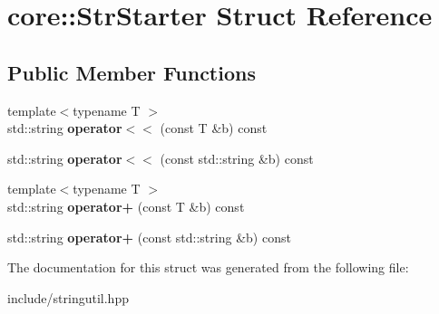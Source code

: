 \hypertarget{structcore_1_1_str_starter}{\section{core\-:\-:Str\-Starter Struct Reference}
\label{structcore_1_1_str_starter}
}
\subsection*{Public Member Functions}
\begin{DoxyCompactItemize}
\item 
\hypertarget{structcore_1_1_str_starter_ac48d4e117cb00f74f13322bcfc9e8bcd}{{\footnotesize template$<$typename T $>$ }\\std\-::string {\bfseries operator$<$$<$} (const T \&b) const }\label{structcore_1_1_str_starter_ac48d4e117cb00f74f13322bcfc9e8bcd}

\item 
\hypertarget{structcore_1_1_str_starter_a9c2a35d35289c4aa96385c12e4445579}{std\-::string {\bfseries operator$<$$<$} (const std\-::string \&b) const }\label{structcore_1_1_str_starter_a9c2a35d35289c4aa96385c12e4445579}

\item 
\hypertarget{structcore_1_1_str_starter_a2df67a5a7c315a1432a375edfc3777fa}{{\footnotesize template$<$typename T $>$ }\\std\-::string {\bfseries operator+} (const T \&b) const }\label{structcore_1_1_str_starter_a2df67a5a7c315a1432a375edfc3777fa}

\item 
\hypertarget{structcore_1_1_str_starter_adbd57a31d9c4090580e1618592f1df81}{std\-::string {\bfseries operator+} (const std\-::string \&b) const }\label{structcore_1_1_str_starter_adbd57a31d9c4090580e1618592f1df81}

\end{DoxyCompactItemize}


The documentation for this struct was generated from the following file\-:\begin{DoxyCompactItemize}
\item 
include/stringutil.\-hpp\end{DoxyCompactItemize}
